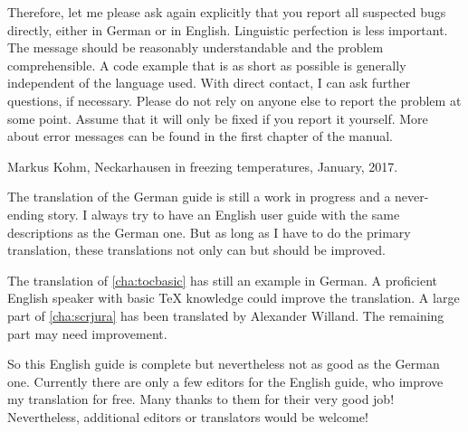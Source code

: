 Therefore, let me please ask again explicitly that you report all suspected
bugs directly, either in German or in English. Linguistic perfection is less
important. The message should be reasonably understandable and the problem
comprehensible. A code example that is as short as possible is generally
independent of the language used. With direct contact, I can ask further
questions, if necessary. Please do not rely on anyone else to report the
problem at some point. Assume that it will only be fixed if you report it
yourself. More about error messages can be found in the first chapter of the
manual.

\bigskip\noindent
Markus Kohm, Neckarhausen in freezing temperatures, January, 2017.


The translation of the German \KOMAScript{} guide is still a work in progress
and a never-ending story. I always try to have an English user guide with the
same descriptions as the German one. But as long as I have to do the primary
translation, these translations not only can but should be improved.

The translation of \autoref{cha:tocbasic} has still an example in German. A
proficient English speaker with basic TeX knowledge could improve the
translation. A large part of \autoref{cha:scrjura} has been translated by
Alexander Willand. The remaining part may need improvement.

So this English guide is complete but nevertheless not as good as the German
one. Currently there are only a few editors for the English guide, who improve
my translation for free. Many thanks to them for their very good job!
Nevertheless, additional editors or translators would be welcome!

\endinput


